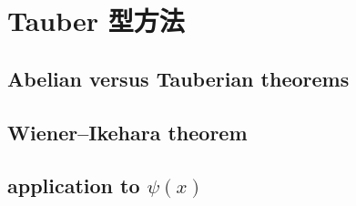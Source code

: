 \section{Tauber 型方法}
\label{b3:sec:2704}


\subsection{Abelian versus Tauberian theorems}
\label{b3:subsec:270401}

\subsection{Wiener–Ikehara theorem}
\label{b3:subsec:270402}

\subsection{application to \texorpdfstring{\(\psi(x)\)}{(x)}}
\label{b3:subsec:270403}


